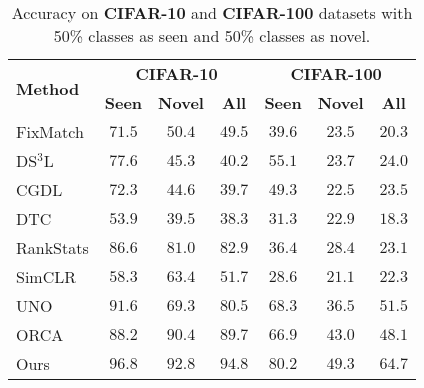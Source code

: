\documentclass[runningheads]{eccv2022submission}
\begin{document}
\begin{table}[h]
\caption{Accuracy on \textbf{CIFAR-10} and \textbf{CIFAR-100} datasets with 50\% classes as seen and 50\% classes as novel.}
\label{tab:cifar10_cifar100}
\begin{center}\setlength{\tabcolsep}{4pt}
\small
\begin{tabular}{lccc|ccc}
\hline



\multicolumn{1}{l}{\multirow{2}{*}{\textbf{Method}}} & \multicolumn{3}{c|}{\textbf{CIFAR-10}} & \multicolumn{3}{c}{\textbf{CIFAR-100}} \\  
\multicolumn{1}{c}{} & \textbf{Seen} & \textbf{Novel} & \textbf{All}  & \textbf{Seen} & \textbf{Novel} & \textbf{All}\\




\hline
FixMatch\cite{sohn2020fixmatch} & $71.5$ & $50.4$ & $49.5$ & $39.6$ & $23.5$ & $20.3$\\
DS$^{3}$L\cite{guo2020safe} & $77.6$ & $45.3$ & $40.2$ & $55.1$ & $23.7$ & $24.0$\\
CGDL\cite{sun2020conditional} & $72.3$ & $44.6$ & $39.7$ & $49.3$ & $22.5$ & $23.5$\\
DTC~\cite{han2019learning} & $53.9$ & $39.5$ & $38.3$ & $31.3$ & $22.9$ & $18.3$\\
RankStats\cite{Han2020Automatically} & $86.6$ & $81.0$ & $82.9$ & $36.4$ & $28.4$ & $23.1$\\
SimCLR\cite{chen2020simple} & $58.3$ & $63.4$ & $51.7$ & $28.6$ & $21.1$ & $22.3$\\
UNO\cite{fini2021unified} & $91.6$ & $69.3$ & $80.5$ & $68.3$ & $36.5$ & $51.5$\\
ORCA\cite{cao2022openworld} & $88.2$ & $90.4$ & $89.7$ & $66.9$ & $43.0$ & $48.1$\\
Ours & {\cellcolor{yellow!15}}${96.8}$ & {\cellcolor{yellow!15}}${92.8}$ & {\cellcolor{yellow!15}}${94.8}$ & {\cellcolor{yellow!15}}${80.2}$ & {\cellcolor{yellow!15}}${49.3}$ & {\cellcolor{yellow!15}}${64.7}$\\\hline 



\end{tabular}
\end{center}
\vspace{-2mm}
\end{table}
\end{document}
